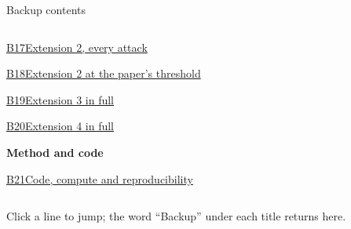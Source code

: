 \documentclass[aspectratio=169,10pt,t]{beamer}
\newcommand{\key}[1]{\textcolor{calblue}{\textbf{#1}}}
\newcommand{\quiet}[1]{\textcolor{muted}{#1}}
\begin{document}
\begin{frame}[label=b0]{Backup contents}
\begin{columns}[T,onlytextwidth]
\begin{column}{0.48\textwidth}
      \hyperlink{b17}{B17\quad Extension 2, every attack}\par
      \hyperlink{b18}{B18\quad Extension 2 at the paper's threshold}\par
      \hyperlink{b19}{B19\quad Extension 3 in full}\par
      \hyperlink{b20}{B20\quad Extension 4 in full}\par
      \vspace{0.6em}
      \key{Method and code}\par\vspace{0.15em}
      \hyperlink{b21}{B21\quad Code, compute and reproducibility}\par
    \end{column}
  \end{columns}
  \vspace{0.8em}
  \quiet{\scriptsize Click a line to jump; the word ``Backup'' under each title returns here.}
\end{frame}
\end{document}
